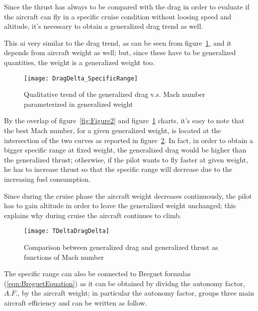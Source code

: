 \bigskip
\noindent
Since the thrust has always to be compared with the drag in order to evaluate if the aircraft can fly in a specific cruise condition without loosing speed and altitude, it's necessary to obtain a generalized drag trend as well. 

This ai very similar to the drag trend, as can be seen from figure~\ref{fig:Figure3}, and it depends from aircraft weight as well; but, since these have to be generalized quantities, the weight is a generalized weight too.

\begin{figure}[b]
\centering
\texttt{[image: DragDelta\_SpecificRange]}
\caption{Qualitative trend of the generalized drag v.s. Mach number parameterized in generalized weight}
\label{fig:Figure3}
\end{figure}

\bigskip
\noindent
By the overlap of figure~\ref{fig:Figure2} and figure~\ref{fig:Figure3} charts, it's easy to note that the best Mach number, for a given generalized weight, is located at the intersection of the two curves as reported in figure~\ref{fig:Figure4}. In fact, in order to obtain a bigger specific range at fixed weight, the generalized drag would be higher than the generalized thrust; otherwise, if the pilot wants to fly faster at given weight, he has to increase thrust so that the specific range will decrease due to the increasing fuel consumption.

Since during the cruise phase the aircraft weight decreases continuously, the pilot has to gain altitude in order to leave the generalized weight unchanged; this explains why during cruise the aircraft continues to climb. 

\begin{figure}[t]
\centering
\texttt{[image: TDeltaDragDelta]}
\caption{Comparison between generalized drag and generalized thrust as functions of Mach number}
\label{fig:Figure4}
\end{figure}

\bigskip
\noindent
The specific range can also be connected to Breguet formulas (\ref{eqn:BreguetEquation}) as it can be obtained by dividng the autonomy factor, $A.F.$, by the aircraft weight; in particular the autonomy factor, groups three main aircraft efficiency and can be written as follow.

